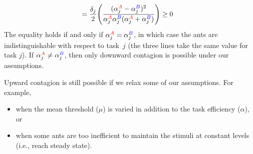 \documentclass[11pt]{article}
\newcommand{\A}{{\color{red}A}}
\newcommand{\B}{{\color{blue}B}}
\begin{document}
\begin{appendices}
\begin{align}
    & = \frac{\delta_j}{2} \Bigg( 
    \frac{ (\alpha_j^{\A} - \alpha_j^{\B})^2 }{\alpha_j^{\A}\alpha_j^{\B}(\alpha_j^{\A} + \alpha_j^{\B})} \Bigg) \geq 0
\end{align}
The equality holds if and only if $\alpha_j^{\A} = \alpha_j^{\B}$, in which case the ants are indistinguishable with respect to task~$j$ (the three lines take the same value for task $j$). If $\alpha_j^{\A}
\neq \alpha_j^{\B}$, then only downward contagion is possible under our assumptions.

Upward contagion is still possible if we relax some of our assumptions. For example,
\begin{itemize}
    \item when the mean threshold ($\mu$) is varied in addition to the task efficiency ($\alpha$), or
    \item when some ants are too inefficient to maintain the stimuli at constant levels (i.e., reach steady state).
\end{itemize}

\end{appendices}
\end{document}
